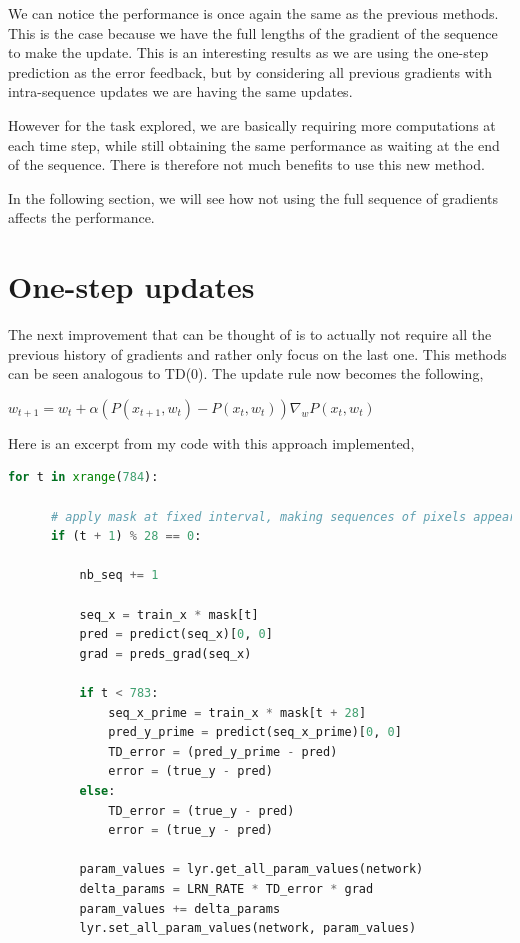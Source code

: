 \documentclass{article}
\begin{document}
We can notice the performance is once again the same as the previous methods. This is the case because we have the full lengths of the gradient of the sequence to make the update. This is an interesting results as we are using the one-step prediction as the error feedback, but by considering all previous gradients with intra-sequence updates we are having the same updates.

However for the task explored, we are basically requiring more computations at each time step, while still obtaining the same performance as waiting at the end of the sequence. There is therefore not much benefits to use this new method.

In the following section, we will see how not using the full sequence of gradients affects the performance.

\section{One-step updates}

The next improvement that can be thought of is to actually not require all the previous history of gradients and rather only focus on the last one. This methods can be seen analogous to TD(0). The update rule now becomes the following,

$w_{t+1} = w_t + \alpha(P(x_{t+1}, w_t) - P(x_t, w_t)) \nabla_w P(x_t, w_t)$

Here is an excerpt from my code with this approach implemented,

\begin{lstlisting}[language=Python]
  for t in xrange(784):

      # apply mask at fixed interval, making sequences of pixels appear
      if (t + 1) % 28 == 0:

          nb_seq += 1

          seq_x = train_x * mask[t]
          pred = predict(seq_x)[0, 0]
          grad = preds_grad(seq_x)

          if t < 783:
              seq_x_prime = train_x * mask[t + 28]
              pred_y_prime = predict(seq_x_prime)[0, 0]
              TD_error = (pred_y_prime - pred)
              error = (true_y - pred)
          else:
              TD_error = (true_y - pred)
              error = (true_y - pred)

          param_values = lyr.get_all_param_values(network)
          delta_params = LRN_RATE * TD_error * grad
          param_values += delta_params
          lyr.set_all_param_values(network, param_values)
\end{lstlisting}
\end{document}
